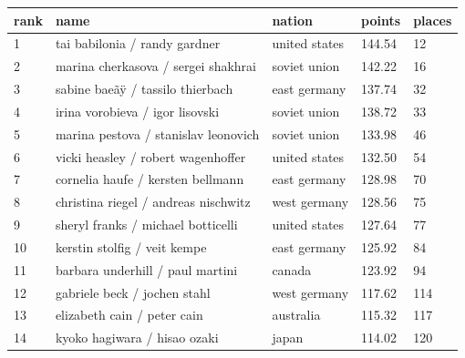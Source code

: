 \documentclass{article}
\begin{document}
\begin{tabular}{lllll}
\toprule
rank & name & nation & points & places \\
\midrule
1 & tai babilonia / randy gardner & united states & 144.54 & 12 \\
2 & marina cherkasova / sergei shakhrai & soviet union & 142.22 & 16 \\
3 & sabine baeãÿ / tassilo thierbach & east germany & 137.74 & 32 \\
4 & irina vorobieva / igor lisovski & soviet union & 138.72 & 33 \\
5 & marina pestova / stanislav leonovich & soviet union & 133.98 & 46 \\
6 & vicki heasley / robert wagenhoffer & united states & 132.50 & 54 \\
7 & cornelia haufe / kersten bellmann & east germany & 128.98 & 70 \\
8 & christina riegel / andreas nischwitz & west germany & 128.56 & 75 \\
9 & sheryl franks / michael botticelli & united states & 127.64 & 77 \\
10 & kerstin stolfig / veit kempe & east germany & 125.92 & 84 \\
11 & barbara underhill / paul martini & canada & 123.92 & 94 \\
12 & gabriele beck / jochen stahl & west germany & 117.62 & 114 \\
13 & elizabeth cain / peter cain & australia & 115.32 & 117 \\
14 & kyoko hagiwara / hisao ozaki & japan & 114.02 & 120 \\
\bottomrule
\end{tabular}
\end{document}
